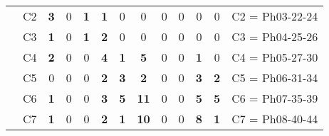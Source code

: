\begin{table}[H]
{\begin{tabular}{|ccrrrrrrrrrrc|}
\multicolumn{1}{|c|}{}                                      & \multicolumn{1}{c|}{C2} & \multicolumn{1}{c|}{\textbf{3}} & \multicolumn{1}{c|}{0}          & \multicolumn{1}{c|}{\textbf{1}} & \multicolumn{1}{c|}{\textbf{1}} & \multicolumn{1}{c|}{0}          & \multicolumn{1}{c|}{0}           & \multicolumn{1}{c|}{0}  & \multicolumn{1}{c|}{0}          & \multicolumn{1}{c|}{0}           & \multicolumn{1}{c|}{0}           & C2 = Ph03-22-24   \\ \cline{2-13}
\multicolumn{1}{|c|}{}                                      & \multicolumn{1}{c|}{C3} & \multicolumn{1}{c|}{\textbf{1}} & \multicolumn{1}{c|}{0}          & \multicolumn{1}{c|}{\textbf{1}} & \multicolumn{1}{c|}{\textbf{2}} & \multicolumn{1}{c|}{0}          & \multicolumn{1}{c|}{0}           & \multicolumn{1}{c|}{0}  & \multicolumn{1}{c|}{0}          & \multicolumn{1}{c|}{0}           & \multicolumn{1}{c|}{0}           & C3 = Ph04-25-26   \\ \cline{2-13}
\multicolumn{1}{|c|}{}                                      & \multicolumn{1}{c|}{C4} & \multicolumn{1}{c|}{\textbf{2}} & \multicolumn{1}{c|}{0}          & \multicolumn{1}{c|}{0}          & \multicolumn{1}{c|}{\textbf{4}} & \multicolumn{1}{c|}{\textbf{1}} & \multicolumn{1}{c|}{\textbf{5}}  & \multicolumn{1}{c|}{0}  & \multicolumn{1}{c|}{0}          & \multicolumn{1}{c|}{\textbf{1}}  & \multicolumn{1}{c|}{0}           & C4 = Ph05-27-30   \\ \cline{2-13}
\multicolumn{1}{|c|}{}                                      & \multicolumn{1}{c|}{C5} & \multicolumn{1}{c|}{0}          & \multicolumn{1}{c|}{0}          & \multicolumn{1}{c|}{0}          & \multicolumn{1}{c|}{\textbf{2}} & \multicolumn{1}{c|}{\textbf{3}} & \multicolumn{1}{c|}{\textbf{2}}  & \multicolumn{1}{c|}{0}  & \multicolumn{1}{c|}{0}          & \multicolumn{1}{c|}{\textbf{3}}  & \multicolumn{1}{c|}{\textbf{2}}  & C5 = Ph06-31-34   \\ \cline{2-13}
\multicolumn{1}{|c|}{}                                      & \multicolumn{1}{c|}{C6} & \multicolumn{1}{c|}{\textbf{1}} & \multicolumn{1}{c|}{0}          & \multicolumn{1}{c|}{0}          & \multicolumn{1}{c|}{\textbf{3}} & \multicolumn{1}{c|}{\textbf{5}} & \multicolumn{1}{c|}{\textbf{11}} & \multicolumn{1}{c|}{0}  & \multicolumn{1}{c|}{0}          & \multicolumn{1}{c|}{\textbf{5}}  & \multicolumn{1}{c|}{\textbf{5}}  & C6 = Ph07-35-39   \\ \cline{2-13}
\multicolumn{1}{|c|}{}                                      & \multicolumn{1}{c|}{C7} & \multicolumn{1}{c|}{\textbf{1}} & \multicolumn{1}{c|}{0}          & \multicolumn{1}{c|}{0}          & \multicolumn{1}{c|}{\textbf{2}} & \multicolumn{1}{c|}{\textbf{1}} & \multicolumn{1}{c|}{\textbf{10}} & \multicolumn{1}{c|}{0}  & \multicolumn{1}{c|}{0}          & \multicolumn{1}{c|}{\textbf{8}}  & \multicolumn{1}{c|}{\textbf{1}}  & C7 = Ph08-40-44   \\ \cline{2-13}

\end{tabular}}
\end{table}
